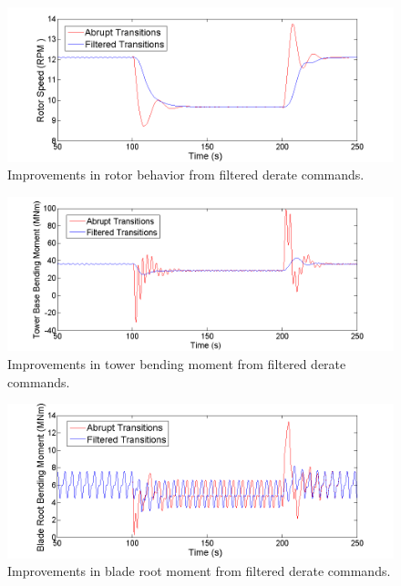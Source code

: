 \begin{figure}[htb]
	\centering
		\includegraphics[width = \linewidth]{Figures/ch4Figures/fig4-14.png}
		
	\caption{Improvements in rotor behavior from filtered derate commands.}
	\label{fig4-14}
\end{figure}

\begin{figure}[htb]
	\centering
		\includegraphics[width = \linewidth]{Figures/ch4Figures/fig4-15.png}
		
	\caption{Improvements in tower bending moment from filtered derate commands.}
	\label{fig4-15}
\end{figure}


\begin{figure}[htb]
	\centering
		\includegraphics[width = \linewidth]{Figures/ch4Figures/fig4-16.png}
		
	\caption{Improvements in blade root moment from filtered derate commands.}
	\label{fig4-16}
\end{figure}


